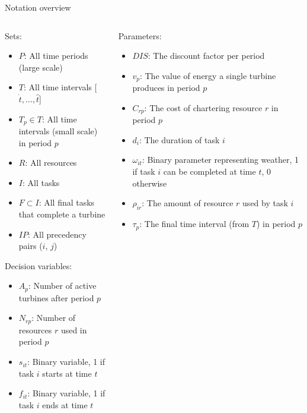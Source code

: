 \documentclass{beamer}
\begin{document}
\begin{frame}{Notation overview}
\scriptsize

\begin{columns}
\begin{column}{.48\textwidth}
Sets:
\begin{itemize}
\item $P$: All time periods (large scale)
\item $T$: All time intervals [$\dot{t}, \dots , \hat{t}$]
\item $T_p \in T$: All time intervals (small scale) in period $p$
\item $R$: All resources
\item $I$: All tasks
\item $F \subset I$: All final tasks that complete a turbine
\item $IP$: All precedency pairs ($i$, $j$)
\end{itemize}

Decision variables:
\begin{itemize}
\item $A_{p}$: Number of active turbines after period $p$
\item $N_{rp}$: Number of resources $r$ used in period $p$
\item $s_{it}$: Binary variable, 1 if task $i$ starts at time $t$
\item $f_{it}$: Binary variable, 1 if task $i$ ends at time $t$
\end{itemize}
\end{column}

\hfill

\begin{column}{.48\textwidth}
Parameters:
\begin{itemize}
\item $DIS$: The discount factor per period
\item $v_p$: The value of energy a single turbine produces in period $p$
\item $C_{rp}$: The cost of chartering resource $r$ in period $p$
\item $d_i$: The duration of task $i$
\item $\omega_{it}$: Binary parameter representing weather, 1 if task $i$ can be completed at time $t$, 0 otherwise
\item $\rho_{ir}$: The amount of resource $r$ used by task $i$
\item $\tau_p$: The final time interval (from $T$) in period $p$
\end{itemize}
\end{column}
\end{columns}

\end{frame}
\end{document}
